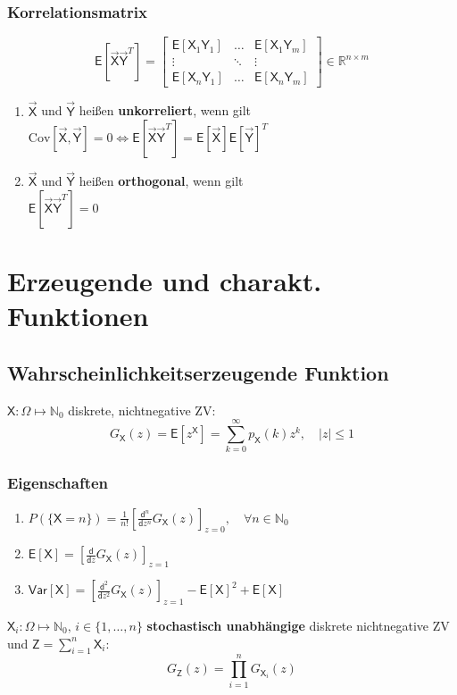 \documentclass[a4paper,twocolumn,10pt]{article}
\newenvironment{iii}{\begin{enumerate}[label={\roman{*})}]}{\end{enumerate}}
\newcommand{\var}{\mathsf{Var}}
\newcommand{\erw}{\mathsf{E}}
\begin{document}
\subsubsection{Korrelationsmatrix}
\[ \erw[\vec{\mathsf X}\vec{\mathsf Y}^T] = \begin{bmatrix} \erw[\mathsf X_1\mathsf Y_1] & \dots & \erw[\mathsf X_1\mathsf Y_m] \\ \vdots & \ddots & \vdots \\ \erw[\mathsf X_n\mathsf Y_1] & \dots & \erw[\mathsf X_n\mathsf Y_m] \end{bmatrix} \in \mathbb R^{n \times m} \]
\begin{iii}
\item $\vec{\mathsf X}$ und $\vec{\mathsf Y}$ heißen \textbf{unkorreliert}, wenn gilt \\ $\text{Cov}[\vec{\mathsf X},\vec{\mathsf Y}] = 0 \Leftrightarrow \erw[\vec{\mathsf X}\vec{\mathsf Y}^T] = \erw[\vec{\mathsf X}]\erw[\vec{\mathsf Y}]^T$
\item $\vec{\mathsf X}$ und $\vec{\mathsf Y}$ heißen \textbf{orthogonal}, wenn gilt \\ $\erw[\vec{\mathsf X}\vec{\mathsf Y}^T] = 0$
\end{iii}

\section{Erzeugende und charakt. Funktionen}
\subsection{Wahrscheinlichkeitserzeugende Funktion}
$\mathsf{X}: \Omega \mapsto \mathbb{N}_{0}$ diskrete, nichtnegative ZV:
\[ G_{\mathsf{X}}(z) = \erw[z^{\mathsf{X}}] = \sum \limits_{k=0}^{\infty} p_{\mathsf{X}}(k)z^{k}, \quad |z| \leq 1\]

\subsubsection{Eigenschaften}
\begin{iii}
  \item $P(\{\mathsf{X} = n\}) = \frac{1}{n!} \left[ \frac{\mathsf{d}^{n}}{\mathsf{d}z^{n}} G_{\mathsf{X}}(z) \right]_{z=0}, \quad \forall n \in \mathbb{N}_{0}$
  \item $\erw[\mathsf{X}] = \left[ \frac{\mathsf{d}}{\mathsf{d}z} G_{\mathsf{X}}(z) \right]_{z=1}$
  \item $\var[\mathsf{X}] = \left[ \frac{\mathsf{d}^{2}}{\mathsf{d}z^{2}} G_{\mathsf{X}}(z) \right]_{z=1} - \erw[\mathsf{X}]^{2} + \erw[\mathsf{X}]$
\end{iii}
$\mathsf{X}_{i}: \Omega \mapsto \mathbb{N}_{0}, \, i \in \{1, \dots, n\}$ \textbf{stochastisch unabhängige} diskrete nichtnegative ZV und $\mathsf{Z} = \sum_{i=1}^{n} \mathsf{X}_{i}$:
\[ G_{\mathsf{Z}}(z) = \prod_{i=1}^{n} G_{\mathsf{X}_{i}}(z) \]
\end{document}
